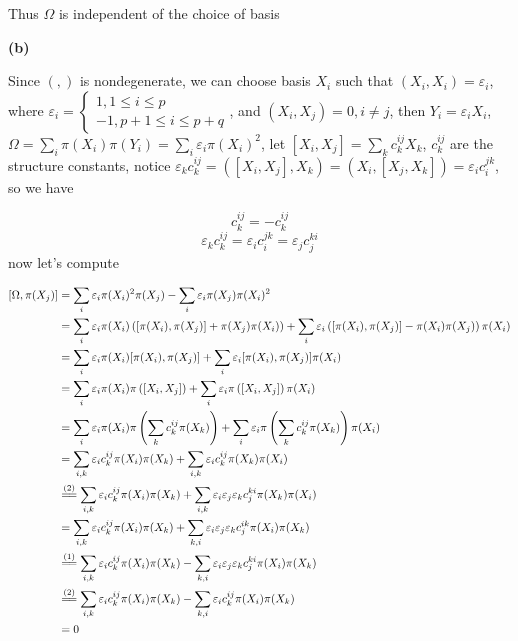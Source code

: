 \documentclass[10pt]{article}
\newcommand{\<}[1]{\langle #1 \rangle}
\begin{document}
Thus $\Omega$ is independent of the choice of basis \par
\textbf{(b)} \par
Since $(,)$ is nondegenerate, we can choose basis $X_i$ such that $(X_i,X_i)=\varepsilon_i$, where $\varepsilon_i=\begin{cases}
1, 1\leq i\leq p \\
-1, p+1\leq i\leq p+q
\end{cases}$, and $(X_i,X_j)=0,i\neq j$, then $Y_i=\varepsilon_i X_i$, $\Omega=\displaystyle\sum_i\pi(X_i)\pi(Y_i)=\sum_i\varepsilon_i\pi(X_i)^2$, let $[X_i,X_j]=\displaystyle\sum_k c^{ij}_kX_k$, $c^{ij}_k$ are the structure constants, notice $\varepsilon_kc_k^{ij}=([X_i,X_j],X_k)=(X_i,[X_j,X_k])=\varepsilon_ic_i^{jk}$, so we have \par
\begin{equation}
c_k^{ij}=-c_k^{ij}
\end{equation}
\begin{equation}
\varepsilon_kc_k^{ij}=\varepsilon_ic_i^{jk}=\varepsilon_jc_j^{ki}
\end{equation}
now let's compute \par
\begin{align*}\displaystyle
[\Omega,\pi(X_j)]&=\sum_i\varepsilon_i\pi(X_i)^2\pi(X_j)-\sum_i\varepsilon_i\pi(X_j)\pi(X_i)^2 \\
&=\sum_i\varepsilon_i\pi(X_i)\left([\pi(X_i),\pi(X_j)]+\pi(X_j)\pi(X_i)\right)+\sum_i\varepsilon_i\left([\pi(X_i),\pi(X_j)]-\pi(X_i)\pi(X_j)\right)\pi(X_i) \\
&=\sum_i\varepsilon_i\pi(X_i)[\pi(X_i),\pi(X_j)]+\sum_i\varepsilon_i[\pi(X_i),\pi(X_j)]\pi(X_i) \\
&=\sum_i\varepsilon_i\pi(X_i)\pi\left([X_i,X_j]\right)+\sum_i\varepsilon_i\pi\left([X_i,X_j]\right)\pi(X_i) \\
&=\sum_i\varepsilon_i\pi(X_i)\pi\left(\sum_kc_k^{ij}\pi(X_k)\right)+\sum_i\varepsilon_i\pi\left(\sum_kc_k^{ij}\pi(X_k)\right)\pi(X_i) \\
&=\sum_{i,k}\varepsilon_i c_k^{ij}\pi(X_i)\pi(X_k)+\sum_{i,k}\varepsilon_i c_k^{ij}\pi(X_k)\pi(X_i) \\
&\overset{(2)}{=\joinrel=}\sum_{i,k}\varepsilon_i c_k^{ij}\pi(X_i)\pi(X_k)+\sum_{i,k}\varepsilon_i\varepsilon_j\varepsilon_k c_j^{ki}\pi(X_k)\pi(X_i) \\
&=\sum_{i,k}\varepsilon_i c_k^{ij}\pi(X_i)\pi(X_k)+\sum_{k,i}\varepsilon_i\varepsilon_j\varepsilon_k c_j^{ik}\pi(X_i)\pi(X_k) \\
&\overset{(1)}{=\joinrel=}\sum_{i,k}\varepsilon_i c_k^{ij}\pi(X_i)\pi(X_k)-\sum_{k,i}\varepsilon_i\varepsilon_j\varepsilon_k c_j^{ki}\pi(X_i)\pi(X_k) \\
&\overset{(2)}{=\joinrel=}\sum_{i,k}\varepsilon_i c_k^{ij}\pi(X_i)\pi(X_k)-\sum_{k,i}\varepsilon_i c_k^{ij}\pi(X_i)\pi(X_k) \\
&=0
\end{align*}
\end{document}
